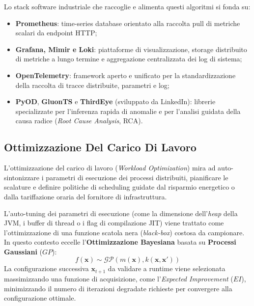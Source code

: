 \documentclass[11pt, a4paper]{article}
\begin{document}
Lo stack software industriale che raccoglie e alimenta questi algoritmi si fonda su:
\begin{itemize}
    \item \textbf{Prometheus}: time-series database orientato alla raccolta pull di metriche scalari da endpoint HTTP;
    \item \textbf{Grafana, Mimir e Loki}: piattaforme di visualizzazione, storage distribuito di metriche a lungo termine e aggregazione centralizzata dei log di sistema;
    \item \textbf{OpenTelemetry}: framework aperto e unificato per la standardizzazione della raccolta di tracce distribuite, parametri e log;
    \item \textbf{PyOD}, \textbf{GluonTS} e \textbf{ThirdEye} (sviluppato da LinkedIn): librerie specializzate per l'inferenza rapida di anomalie e per l'analisi guidata della causa radice (\emph{Root Cause Analysis}, RCA).
\end{itemize}


\subsection{Ottimizzazione Del Carico Di Lavoro}

L'ottimizzazione del carico di lavoro (\emph{Workload Optimization}) mira ad auto-sintonizzare i parametri di esecuzione dei processi distribuiti, pianificare le scalature e definire politiche di scheduling guidate dal risparmio energetico o dalla tariffazione oraria del fornitore di infrastruttura.

L'auto-tuning dei parametri di esecuzione (come la dimensione dell'\emph{heap} della JVM, i buffer di thread o i flag di compilazione JIT) viene trattato come l'ottimizzazione di una funzione scatola nera (\emph{black-box}) costosa da campionare. In questo contesto eccelle l'\textbf{Ottimizzazione Bayesiana} basata su \textbf{Processi Gaussiani} ($GP$):
\begin{equation}
    f(\bm{x}) \sim \mathcal{GP}\left(m(\bm{x}), k(\bm{x}, \bm{x}')\right)
\end{equation}
La configurazione successiva $\bm{x}_{t+1}$ da validare a runtime viene selezionata massimizzando una funzione di acquisizione, come l'\emph{Expected Improvement} ($EI$), minimizzando il numero di iterazioni degradate richieste per convergere alla configurazione ottimale.
\end{document}

